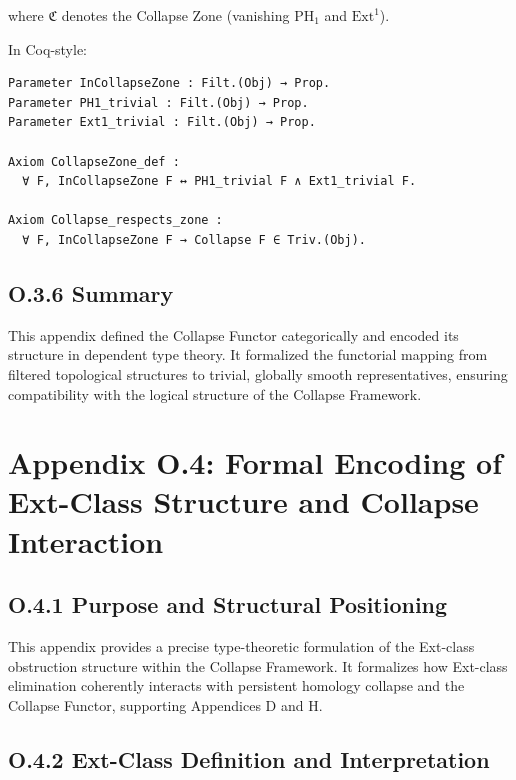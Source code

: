 \documentclass[11pt]{article}
\begin{document}
where \( \mathfrak{C} \) denotes the Collapse Zone (vanishing \( \mathrm{PH}_1 \) and \( \mathrm{Ext}^1 \)).

In Coq-style:

\begin{lstlisting}[language=Coq]
Parameter InCollapseZone : Filt.(Obj) → Prop.
Parameter PH1_trivial : Filt.(Obj) → Prop.
Parameter Ext1_trivial : Filt.(Obj) → Prop.

Axiom CollapseZone_def :
  ∀ F, InCollapseZone F ↔ PH1_trivial F ∧ Ext1_trivial F.

Axiom Collapse_respects_zone :
  ∀ F, InCollapseZone F → Collapse F ∈ Triv.(Obj).
\end{lstlisting}

\subsection*{O.3.6 Summary}

This appendix defined the Collapse Functor categorically and encoded its structure in dependent type theory.  
It formalized the functorial mapping from filtered topological structures to trivial, globally smooth representatives, ensuring compatibility with the logical structure of the Collapse Framework.



\section*{Appendix O.4: Formal Encoding of Ext-Class Structure and Collapse Interaction}

\subsection*{O.4.1 Purpose and Structural Positioning}

This appendix provides a precise type-theoretic formulation of the Ext-class obstruction structure within the Collapse Framework.  
It formalizes how Ext-class elimination coherently interacts with persistent homology collapse and the Collapse Functor, supporting Appendices D and H.

\subsection*{O.4.2 Ext-Class Definition and Interpretation}
\end{document}
